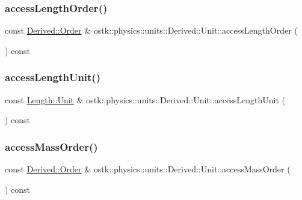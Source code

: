 \subsubsection{\texorpdfstring{access\+Length\+Order()}{accessLengthOrder()}}
{\footnotesize\ttfamily const \hyperlink{classostk_1_1physics_1_1units_1_1_derived_1_1_order}{Derived\+::\+Order} \& ostk\+::physics\+::units\+::\+Derived\+::\+Unit\+::access\+Length\+Order (\begin{DoxyParamCaption}{ }\end{DoxyParamCaption}) const}

\mbox{\label{classostk_1_1physics_1_1units_1_1_derived_1_1_unit_a925301080673e1eb527ea6dc1340b1bb}} 
\subsubsection{\texorpdfstring{access\+Length\+Unit()}{accessLengthUnit()}}
{\footnotesize\ttfamily const \hyperlink{classostk_1_1physics_1_1units_1_1_length_a2664470a7eedf5d45c88861fe69badea}{Length\+::\+Unit} \& ostk\+::physics\+::units\+::\+Derived\+::\+Unit\+::access\+Length\+Unit (\begin{DoxyParamCaption}{ }\end{DoxyParamCaption}) const}

\mbox{\label{classostk_1_1physics_1_1units_1_1_derived_1_1_unit_a0925bae88750951158517c1e5fb8605f}} 
\subsubsection{\texorpdfstring{access\+Mass\+Order()}{accessMassOrder()}}
{\footnotesize\ttfamily const \hyperlink{classostk_1_1physics_1_1units_1_1_derived_1_1_order}{Derived\+::\+Order} \& ostk\+::physics\+::units\+::\+Derived\+::\+Unit\+::access\+Mass\+Order (\begin{DoxyParamCaption}{ }\end{DoxyParamCaption}) const}

